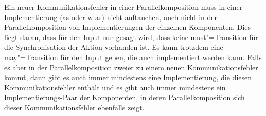 Ein neuer Kommunikationsfehler in einer Parallelkomposition muss in einer
Implementierung (as oder w-as) nicht auftauchen, auch nicht in der
Parallelkomposition von Implementierungen der einzelnen Komponenten. Dies liegt
daran, dass für den Input nur gesagt wird, dass keine must"=Transition für die
Synchronisation der Aktion vorhanden ist. Es kann trotzdem eine
may"=Transition für den Input geben, die auch implementiert werden kann.
Falls es aber in der Parallelkomposition zweier \MEIO{} zu einem neuen
Kommunikationsfehler kommt, dann gibt es auch immer mindestens eine
Implementierung, die diesen Kommunikationsfehler enthält und es gibt auch immer
mindestens ein Implementierungs-Paar der Komponenten, in deren
Parallelkomposition sich dieser Kommunikationsfehler ebenfalls zeigt.
